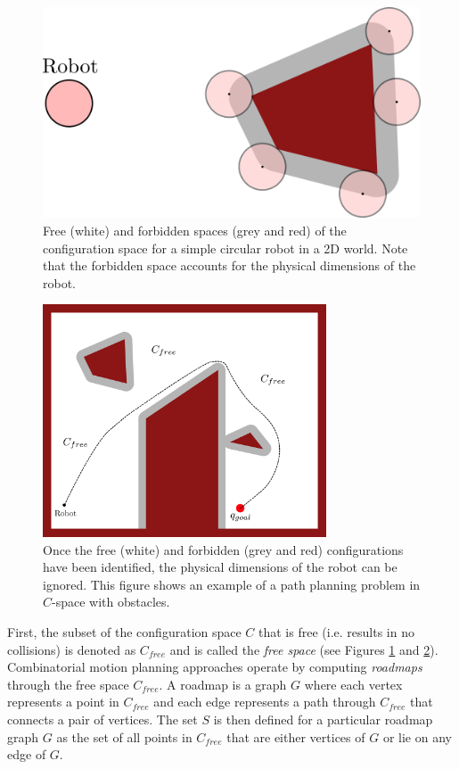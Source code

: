 \begin{figure}[ht]
 \centering
 	\includegraphics[width=.5\textwidth]{tex/figs/ch05_figs/obs_padding.png}
	\caption{Free (white) and forbidden spaces (grey and red) of the configuration space for a simple circular robot in a 2D world. Note that the forbidden space accounts for the physical dimensions of the robot.}
 \label{fig:collision-free-space-fig}
\end{figure}
\begin{figure}[ht]
\begin{center}
\includegraphics[width=0.75\textwidth]{tex/figs/ch05_figs/2d_ws_Cfree.png}
\caption{Once the free (white) and forbidden (grey and red) configurations have been identified, the physical dimensions of the robot can be ignored. This figure shows an example of a path planning problem in $C$-space with obstacles.}
\label{fig:combinatorial-planning}
\end{center}
\end{figure}
First, the subset of the configuration space $C$ that is free (i.e. results in no collisions) is denoted as $C_{free}$ and is called the \textit{free space} (see Figures \ref{fig:collision-free-space-fig} and \ref{fig:combinatorial-planning}).
Combinatorial motion planning approaches operate by computing \textit{roadmaps} through the free space $C_{free}$. A roadmap is a graph $G$ where each vertex represents a point in $C_{free}$ and each edge represents a path through $C_{free}$ that connects a pair of vertices. The set $S$ is then defined for a particular roadmap graph $G$ as the set of all points in $C_{free}$ that are either vertices of $G$ or lie on any edge of $G$.
